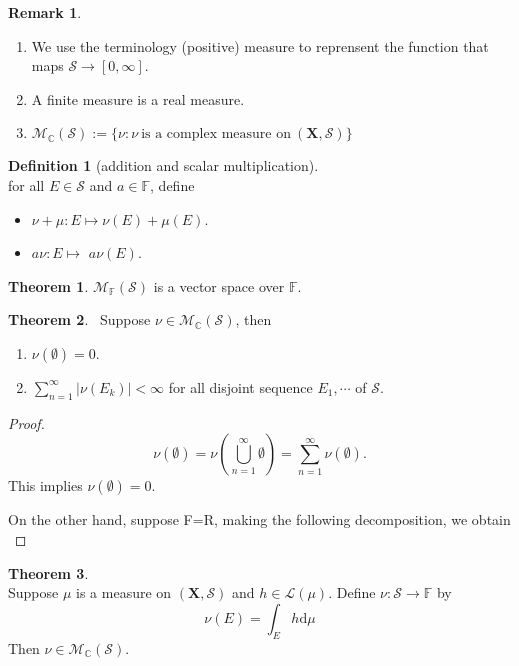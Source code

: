 \documentclass[12pt]{book}
\theoremstyle{definition}
\newtheorem{definition}{Definition}[chapter]
\newtheorem{theorem}{Theorem}[chapter]
\newtheorem{remark}{Remark}
\newcommand{\C}{\mathbb{C}}
\newcommand{\F}{\mathbb{F}}
\newcommand{\X}{\mathbf{X}}
\newcommand{\D}{\mathrm{d}}
\newcommand{\M}{\mathcal{M}}
\newcommand{\LL}{\mathcal{L}}
\newcommand{\Sum}[2]{{\sum_{#1}^{#2}}}
\newcommand{\Union}[2]{{\bigcup_{#1}^{#2}}}
\begin{document}
\begin{remark} \
\begin{enumerate}
  \item 	We use the terminology (positive) measure to reprensent the function that maps $ \mathcal S \to [0,\infty]$.
  \item A finite measure is a real measure.
  \item $\M_{\C}(\mathcal S):=\{\nu:\nu \ \text{is a complex measure on}\ (\X,\mathcal S) \}$
\end{enumerate}
\end{remark}

\begin{definition}[addition and scalar multiplication] \ \\
for all $E\in \mathcal S$ and $a \in \F$, define
\begin{itemize}
	\item $\nu+\mu: E \mapsto \nu(E)+\mu(E)$.
	\item $a\nu: E \mapsto$ $a\nu(E)$.
\end{itemize}
\end{definition}
\begin{theorem}
$\M_\F(\mathcal S)$	is a vector space over $\F$.
\end{theorem}


\begin{theorem}\
Suppose $\nu \in \M_{\C}(\mathcal S)$, then 
\begin{enumerate}
	\item $\nu(\emptyset)=0$.
	\item $\sum_{n=1}^{\infty}|\nu(E_k)| < \infty$ for all disjoint sequence $E_1,\cdots$ of $\mathcal S$.
\end{enumerate}
\end{theorem}
\begin{proof}
$$
\nu(\emptyset) = \nu(\Union{n=1}{\infty}\emptyset) = \Sum{n=1}{\infty}\nu(\emptyset).
$$
This implies $\nu(\emptyset)=0$. \par
On the other hand, suppose F=R, making the following decomposition, we obtain
$$
$$
\end{proof}

\begin{theorem}\ \\
Suppose $\mu$ is a measure on $(\X,\mathcal S)$ and $h \in \LL(\mu)$. Define $\nu:\mathcal S \to \F$ by 
$$
\nu(E) = \int_E h \D \mu
$$
Then $\nu \in \M_\C(\mathcal S)$.
\end{theorem}
\end{document}
